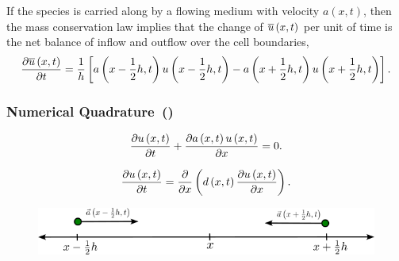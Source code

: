 \begin{frame}
    \begin{theorem}
        If the species is carried along by a flowing medium with
        velocity
        \begin{math}
            a\left(x,t\right)
        \end{math},
        then the mass conservation law
        implies that the change of
        \begin{math}
             \overline{u}\left(x,t\right)
        \end{math}
        per
        unit of time is the net balance of inflow and outflow over
        the cell boundaries,
        \begin{equation*}
            \diffp{\averageconcentration}{t}=
            \dfrac{1}{h}
            \left[
                a
                \left(
                x-\frac{1}{2}h,t
                \right)
                u
                \left(
                x-\frac{1}{2}h,t
                \right)-
                a
                \left(
                x+\frac{1}{2}h,t
                \right)
                u
                \left(
                x+\frac{1}{2}h,t
                \right)
                \right].
        \end{equation*}
    \end{theorem}
\end{frame}

\begin{frame}
    \frametitle{Numerical Quadrature~(\citeauthor[p.~9]{Hundsdorfer2003})}

    \begin{definition}
        \begin{equation*}
            \diffp{\concentration}{t}+
            \diffp{a\left(x,t\right)\concentration}{x}=
            0.
        \end{equation*}
    \end{definition}

    \begin{definition}
        \begin{equation*}
            \diffp{\concentration}{t}=
            \diffp{}{x}
            \left(
            d\left(x,t\right)\diffp{\concentration}{x}
            \right).
        \end{equation*}
    \end{definition}

    \begin{figure}[ht!]
        \centering
        \includegraphics[width=.6\paperwidth]{deduction}
    \end{figure}
\end{frame}

